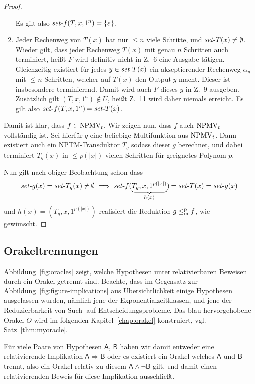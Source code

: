 \begin{proof}
\begin{enumerate}[label=\arabic*.]
            Es gilt also $\mathit{set}\text{-}{f}(T, x, 1^n)=\{\varepsilon\}$.
        \item Jeder Rechenweg von $T(x)$ hat nur $\leq n$ viele Schritte, und $\mathit{set}\text{-}{T}(x)\neq\emptyset$. 
            Wieder gilt, dass jeder Rechenweg $T(x)$ mit genau $n$ Schritten auch terminiert, heißt $F$ wird definitiv nicht in Z.~6 eine Ausgabe tätigen.
            Gleichzeitig existiert für jedes $y\in \mathit{set}\text{-}{T}(x)$ ein akzeptierender Rechenweg $\alpha_y$ mit $\leq n$ Schritten, welcher auf $T(x)$ den Output $y$ macht. Dieser ist insbesondere terminierend. Damit wird auch $F$ dieses $y$ in Z.~9 ausgeben.
            Zusätzlich gilt $(T, x, 1^n)\not\in U$, heißt Z.~11 wird daher niemals erreicht.
            Es gilt also $\mathit{set}\text{-}{f}(T, x, 1^n)=\mathit{set}\text{-}{T}(x)$.
    \end{enumerate}

    Damit ist klar, dass $f\in\mathrm{NPMV}_t$.
    Wir zeigen nun, dass $f$ auch $\mathrm{NPMV}_t$-vollständig ist.
    Sei hierfür $g$ eine beliebige Multifunktion aus $\mathrm{NPMV}_t$.
    Dann existiert auch ein NPTM-Transduktor $T_g$ sodass dieser $g$ berechnet, und dabei terminiert $T_g(x)$ in $\leq p(|x|)$ vielen Schritten für geeignetes Polynom $p$.

    Nun gilt nach obiger Beobachtung schon dass 
    \[ \mathit{set}\text{-}{g}(x) = \mathit{set}\text{-}{T_g}(x)\neq\emptyset \implies \mathit{set}\text{-}{f}(\underbrace{T_g, x, 1^{p(|x|)}}_{h(x)})=\mathit{set}\text{-}{T}(x)=\mathit{set}\text{-}{g}(x) \]
    und $h(x)=(T_g, x, 1^{p(|x|)})$ realisiert die Reduktion $g\leq_\mathrm{m}^\mathrm{p} f$, wie gewünscht.
\end{proof}

\subsection*{Orakeltrennungen}


Abbildung~\ref{fig:oracles} zeigt, welche Hypothesen unter relativierbaren Beweisen durch ein Orakel getrennt sind.
Beachte, dass im Gegensatz zur Abbildung~\ref{fig:figure-implications} aus Übersichtlichkeit einige Hypothesen ausgelassen wurden, nämlich jene der Exponentialzeitklassen, und jene der Reduzierbarkeit von Such- auf Entscheidungsprobleme.
Das blau hervorgehobene Orakel $O$ wird im folgenden Kapitel~\ref{chap:orakel} konstruiert, vgl. Satz~\ref{thm:myoracle}.

Für viele Paare von Hypothesen $\mathsf{A}$, $\mathsf{B}$ haben wir damit entweder eine relativierende Implikation $\mathsf{A}\Rightarrow\mathsf{B}$ oder es existiert ein Orakel welches $\mathsf{A}$ und $\mathsf{B}$ trennt,  also ein Orakel relativ zu diesem $\mathsf{A}\land \neg\mathsf{B}$ gilt, und damit einen relativierenden Beweis für diese Implikation ausschließt. 

